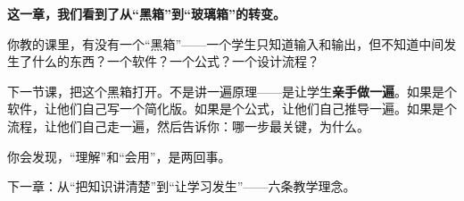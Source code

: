 \vspace{1cm}

\begin{decision-point}
\label{decision:chap8}

\noindent\textbf{这一章，我们看到了从``黑箱''到``玻璃箱''的转变。}

\vspace{0.3cm}

\noindent 你教的课里，有没有一个``黑箱''——一个学生只知道输入和输出，但不知道中间发生了什么的东西？一个软件？一个公式？一个设计流程？

\noindent 下一节课，把这个黑箱打开。不是讲一遍原理——是让学生\textbf{亲手做一遍}。如果是个软件，让他们自己写一个简化版。如果是个公式，让他们自己推导一遍。如果是个流程，让他们自己走一遍，然后告诉你：哪一步最关键，为什么。

\noindent 你会发现，``理解''和``会用''，是两回事。
\end{decision-point}

\vspace{0.5cm}

\begin{flushright}
{\small\color{muted} 下一章：从``把知识讲清楚''到``让学习发生''——六条教学理念。}
\end{flushright}
